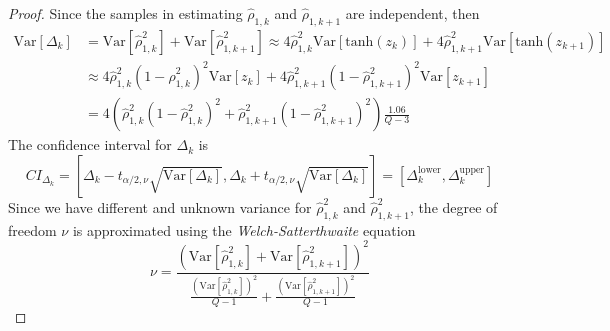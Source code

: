 \begin{proof}
	Since the samples in estimating $\widehat \rho_{1,k}$ and $\widehat\rho_{1,k+1}$ are independent, then 
	\begin{align*}
	\text{Var}\left[\Delta_k\right] &= \text{Var}\left[\widehat \rho_{1,k}^2\right] + \text{Var}\left[\widehat \rho_{1,k+1}^2\right]\approx 4\widehat \rho_{1,k}^2\text{Var}\left[\text{tanh}(z_k)\right]+4\widehat \rho_{1,k+1}^2\text{Var}\left[\text{tanh}(z_{k+1})\right]\\
	&\approx 4\widehat \rho_{1,k}^2\left(1-\widehat \rho_{1,k}^2\right)^2\text{Var}\left[z_k\right]+4\widehat \rho_{1,k+1}^2\left(1-\widehat \rho_{1,k+1}^2\right)^2\text{Var}\left[z_{k+1}\right] \\
	&= 4\left(\widehat \rho_{1,k}^2\left(1-\widehat \rho_{1,k}^2\right)^2+\widehat \rho_{1,k+1}^2\left(1-\widehat \rho_{1,k+1}^2\right)^2\right)\frac{1.06}{Q-3}
	\end{align*}
	The confidence interval for $\Delta_k$ is 
	\[
	CI_{\Delta_k} = \left[\Delta_k-t_{\alpha/2, \nu} \sqrt{\text{Var}\left[\Delta_k\right]}, \Delta_k+t_{\alpha/2,\nu} \sqrt{\text{Var}\left[\Delta_k\right]}\right] = \left[\Delta_k^{\text{lower}},\Delta_k^{\text{upper}}\right]
	\]
	Since we have different and  unknown variance for $\widehat \rho_{1,k}^2$ and $\widehat \rho_{1,k+1}^2$, the degree of freedom $\nu$ is approximated using the {\it Welch-Satterthwaite} equation
	\[
	\nu = \frac{\left(\text{Var}\left[\widehat \rho_{1,k}^2\right] + \text{Var}\left[\widehat \rho_{1,k+1}^2\right]\right)^2}{\frac{\left(\text{Var}\left[\widehat \rho_{1,k}^2\right]\right)^2 }{Q-1}+ \frac{\left(\text{Var}\left[\widehat \rho_{1,k+1}^2\right]\right)^2 }{Q-1} }
	\]
	
	
	
	

\end{proof}
